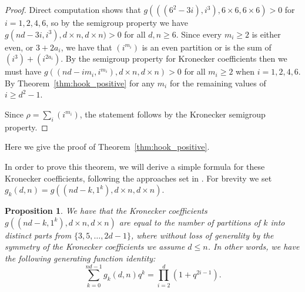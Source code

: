 \documentclass{article}
\numberwithin{equation}{section}
\newtheorem{proposition}[equation]{Proposition}
\theoremstyle{definition}
\begin{document}
\begin{proof}
Direct computation shows that $g(((6^2-3i),i^3), 6\times 6, 6 \times 6) >0$ for $i=1,2,4,6$, so by the semigroup property we have $g(nd -3i, i^3), d \times n, d\times n)>0$ for all $d,n \geq 6$. Since every $m_i \geq 2$ is either even, or $3+2a_i$, we have that $(i^{m_i})$ is an even partition or is the sum of $(i^3) + (i^{2a_i})$. By the semigroup property for Kronecker coefficients then we must have $g( (nd - im_i, i^{m_i}), d \times n, d \times n)>0$ for all $m_i \geq 2$ when $i=1,2,4,6$. By Theorem~\ref{thm:hook_positive} for any $m_i$ for the remaining values of $i \geq d^2-1$. 


Since $\rho = \sum_i (i^{m_i})$, the statement follows by the Kronecker semigroup property.\end{proof}





Here we give the proof of Theorem~\ref{thm:hook_positive}. 

In order to prove this theorem, we will derive a simple formula for these Kronecker coefficients, following the approaches set in \cite{bla:12,liu:14,pp:14}. For brevity we set $g_k(d,n) = g((nd-k,1^k), d \times n, d\times n) $. 

\begin{proposition}
 We have that the Kronecker coefficients $g((nd-k,1^k), d \times n, d\times n) $ are equal to the number of partitions of $k$ into distinct parts from $\{3,5,\ldots, 2d-1\}$, where without loss of generality by the symmetry of the Kronecker coefficients we assume $d \leq n$. In other words, we have the following generating function identity:
 $$\sum_{k=0}^{nd-1} g_k(d,n) q^k = \prod_{i=2}^{d} (1+q^{2i-1}).$$
\end{proposition}
\end{document}
